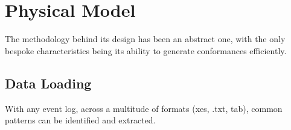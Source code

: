 \section{Physical Model}
The methodology behind its design has been an abstract one, with the only bespoke characteristics being its ability to generate conformances efficiently. 


\subsection{Data Loading}
With any event log, across a multitude of formats (xes, .txt, tab), common patterns can be identified and extracted.